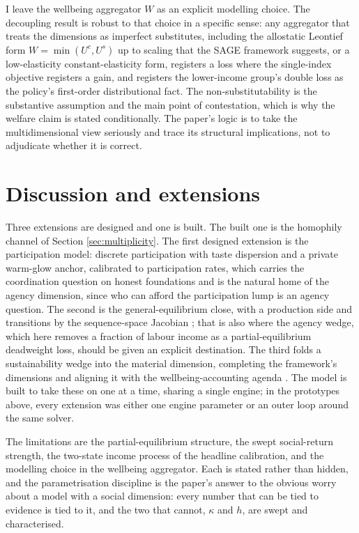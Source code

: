 \documentclass[11pt]{article}
\begin{document}
I leave the wellbeing aggregator $W$ as an explicit modelling choice. The decoupling result is robust to that choice in a specific sense: any aggregator that treats the dimensions as imperfect substitutes, including the allostatic Leontief form $W = \min(U^c, U^s)$ up to scaling that the SAGE framework suggests, or a low-elasticity constant-elasticity form, registers a loss where the single-index objective registers a gain, and registers the lower-income group's double loss as the policy's first-order distributional fact. The non-substitutability is the substantive assumption and the main point of contestation, which is why the welfare claim is stated conditionally. The paper's logic is to take the multidimensional view seriously and trace its structural implications, not to adjudicate whether it is correct.

\section{Discussion and extensions}

Three extensions are designed and one is built. The built one is the homophily channel of Section \ref{sec:multiplicity}. The first designed extension is the participation model: discrete participation with taste dispersion and a private warm-glow anchor, calibrated to participation rates, which carries the coordination question on honest foundations and is the natural home of the agency dimension, since who can afford the participation lump is an agency question. The second is the general-equilibrium close, with a production side and transitions by the sequence-space Jacobian \citep{auclert2021}; that is also where the agency wedge, which here removes a fraction of labour income as a partial-equilibrium deadweight loss, should be given an explicit destination. The third folds a sustainability wedge into the material dimension, completing the framework's dimensions and aligning it with the wellbeing-accounting agenda \citep{hoekstra2019}. The model is built to take these on one at a time, sharing a single engine; in the prototypes above, every extension was either one engine parameter or an outer loop around the same solver.

The limitations are the partial-equilibrium structure, the swept social-return strength, the two-state income process of the headline calibration, and the modelling choice in the wellbeing aggregator. Each is stated rather than hidden, and the parametrisation discipline is the paper's answer to the obvious worry about a model with a social dimension: every number that can be tied to evidence is tied to it, and the two that cannot, $\kappa$ and $h$, are swept and characterised.
\end{document}
